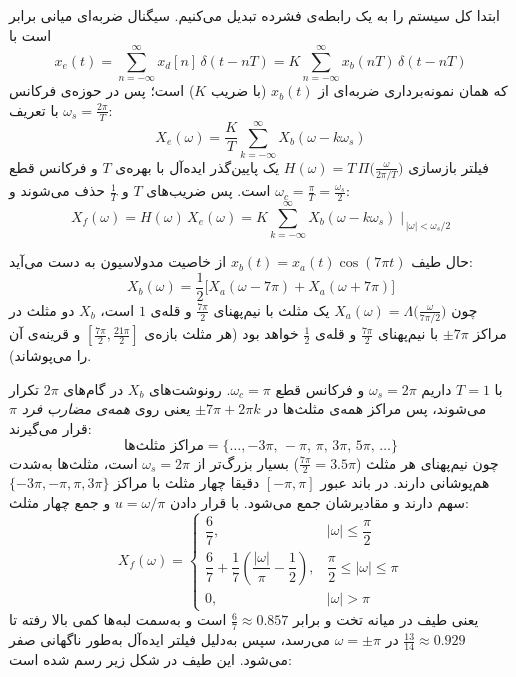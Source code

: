 
ابتدا کل سیستم را به یک رابطه‌ی فشرده تبدیل می‌کنیم. سیگنال ضربه‌ای میانی برابر است با
\[
x_e(t) = \sum_{n=-\infty}^{\infty} x_d[n]\,\delta(t-nT)
       = K\sum_{n=-\infty}^{\infty} x_b(nT)\,\delta(t-nT)
\]
که همان نمونه‌برداری ضربه‌ای از $x_b(t)$ (با ضریب $K$) است؛ پس در حوزه‌ی فرکانس با تعریف $\omega_s = \frac{2\pi}{T}$:
\[
X_e(\omega) = \frac{K}{T}\sum_{k=-\infty}^{\infty} X_b(\omega - k\omega_s)
\]
فیلتر بازسازی $H(\omega) = T\,\Pi\!\big(\frac{\omega}{2\pi/T}\big)$ یک پایین‌گذر ایده‌آل با بهره‌ی $T$ و فرکانس قطع $\omega_c = \frac{\pi}{T} = \frac{\omega_s}{2}$ است. پس ضریب‌های $T$ و $\frac{1}{T}$ حذف می‌شوند و:
\[
X_f(\omega) = H(\omega)\,X_e(\omega)
           = K\!\!\sum_{k=-\infty}^{\infty} X_b(\omega - k\omega_s)\;\Big|_{\,|\omega|<\omega_s/2}
\]

حال طیف $x_b(t) = x_a(t)\cos(7\pi t)$ از خاصیت مدولاسیون به دست می‌آید:
\[
X_b(\omega) = \frac{1}{2}\big[X_a(\omega-7\pi) + X_a(\omega+7\pi)\big]
\]
چون $X_a(\omega) = \Lambda\!\big(\frac{\omega}{7\pi/2}\big)$ یک مثلث با نیم‌پهنای $\frac{7\pi}{2}$ و قله‌ی $1$ است، $X_b$ دو مثلث در مراکز $\pm 7\pi$ با نیم‌پهنای $\frac{7\pi}{2}$ و قله‌ی $\frac{1}{2}$ خواهد بود (هر مثلث بازه‌ی $[\frac{7\pi}{2}, \frac{21\pi}{2}]$ و قرینه‌ی آن را می‌پوشاند).

با $T=1$ داریم $\omega_s = 2\pi$ و فرکانس قطع $\omega_c = \pi$. رونوشت‌های $X_b$ در گام‌های $2\pi$ تکرار می‌شوند، پس مراکز همه‌ی مثلث‌ها در $\pm 7\pi + 2\pi k$ یعنی روی \emph{همه‌ی مضارب فرد} $\pi$ قرار می‌گیرند:
\[
\text{مراکز مثلث‌ها} = \{\dots, -3\pi,\, -\pi,\, \pi,\, 3\pi,\, 5\pi,\, \dots\}
\]
چون نیم‌پهنای هر مثلث ($\frac{7\pi}{2} = 3.5\pi$) بسیار بزرگ‌تر از $\omega_s = 2\pi$ است، مثلث‌ها به‌شدت هم‌پوشانی دارند. در باند عبور $[-\pi, \pi]$ دقیقا چهار مثلث با مراکز $\{-3\pi, -\pi, \pi, 3\pi\}$ سهم دارند و مقادیرشان جمع می‌شود. با قرار دادن $u = \omega/\pi$ و جمع چهار مثلث:
\[
X_f(\omega) =
\begin{cases}
\dfrac{6}{7}, & |\omega| \leq \dfrac{\pi}{2}\\[10pt]
\dfrac{6}{7} + \dfrac{1}{7}\!\left(\dfrac{|\omega|}{\pi} - \dfrac{1}{2}\right), & \dfrac{\pi}{2} \leq |\omega| \leq \pi\\[10pt]
0, & |\omega| > \pi
\end{cases}
\]
یعنی طیف در میانه تخت و برابر $\frac{6}{7} \approx 0.857$ است و به‌سمت لبه‌ها کمی بالا رفته تا $\frac{13}{14} \approx 0.929$ در $\omega = \pm\pi$ می‌رسد، سپس به‌دلیل فیلتر ایده‌آل به‌طور ناگهانی صفر می‌شود. این طیف در شکل زیر رسم شده است:


